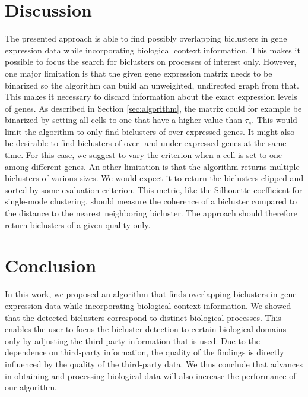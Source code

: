 \documentclass[10pt, conference, compsocconf]{IEEEtran}
\begin{document}
\section{Discussion}
\label{sec:discussion}
The presented approach is able to find possibly overlapping biclusters in gene expression data while incorporating biological context information.
This makes it possible to focus the search for biclusters on processes of interest only.
However, one major limitation is that the given gene expression matrix needs to be binarized so the algorithm can build an unweighted, undirected graph from that.
This makes it necessary to discard information about the exact expression levels of genes.
As described in Section \ref{sec:algorithm}, the matrix could for example be binarized by setting all cells to one that have a higher value than $\tau_e$.
This would limit the algorithm to only find biclusters of over-expressed genes.
It might also be desirable to find biclusters of over- and under-expressed genes at the same time.
For this case, we suggest to vary the criterion when a cell is set to one among different genes.
An other limitation is that the algorithm returns multiple biclusters of various sizes.
We would expect it to return the biclusters clipped and sorted by some evaluation criterion.
This metric, like the Silhouette coefficient \citep{Silhouette87} for single-mode clustering, should measure the coherence of a bicluster compared to the distance to the nearest neighboring bicluster.
The approach should therefore return biclusters of a given quality only.
\section{Conclusion}
\label{sec:conclusion}
In this work, we proposed an algorithm that finds overlapping biclusters in gene expression data while incorporating biological context information.
We showed that the detected biclusters correspond to distinct biological processes.
This enables the user to focus the bicluster detection to certain biological domains only by adjusting the third-party information that is used.
Due to the dependence on third-party information, the quality of the findings is directly influenced by the quality of the third-party data.
We thus conclude that advances in obtaining and processing biological data will also increase the performance of our algorithm.


\end{document}

